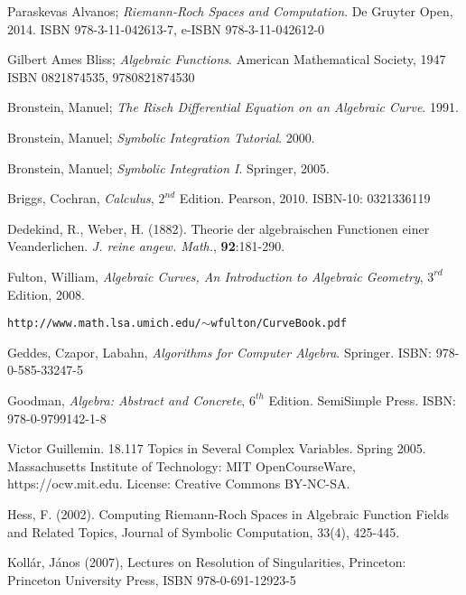 

\begin{thebibliography}{9}

Paraskevas Alvanos;
{\it Riemann-Roch Spaces and Computation}.
De Gruyter Open, 2014.
ISBN 978-3-11-042613-7, e-ISBN 978-3-11-042612-0

Gilbert Ames Bliss; {\it Algebraic Functions}. American Mathematical Society, 1947
ISBN 0821874535, 9780821874530

Bronstein, Manuel; {\it The Risch Differential Equation on an Algebraic Curve}. 1991.

Bronstein, Manuel; {\it Symbolic Integration Tutorial}. 2000.

Bronstein, Manuel; {\it Symbolic Integration I}. Springer, 2005.

Briggs, Cochran, {\it Calculus}, $2^{nd}$ Edition.  Pearson, 2010.  ISBN-10: 0321336119

Dedekind, R., Weber, H. (1882). Theorie der algebraischen Functionen einer Veanderlichen.
{\it J. reine angew. Math.}, {\bf 92}:181-290.

Fulton, William, {\it Algebraic Curves, An Introduction to Algebraic Geometry}, $3^{rd}$ Edition, 2008.

{\tt http://www.math.lsa.umich.edu/$\sim$wfulton/CurveBook.pdf}

Geddes, Czapor, Labahn, {\it Algorithms for Computer Algebra}. Springer.
ISBN: 978-0-585-33247-5

Goodman, {\it Algebra: Abstract and Concrete}, $6^{th}$ Edition.  SemiSimple Press.
ISBN: 978-0-9799142-1-8

Victor Guillemin. 18.117 Topics in Several Complex Variables. Spring 2005. Massachusetts Institute of Technology: MIT OpenCourseWare, https://ocw.mit.edu. License: Creative Commons BY-NC-SA.

Hess, F. (2002). Computing Riemann-Roch Spaces in Algebraic Function Fields and Related Topics,
Journal of Symbolic Computation, 33(4), 425-445.

Kollár, János (2007), Lectures on Resolution of Singularities, Princeton: Princeton University Press, ISBN 978-0-691-12923-5


\end{thebibliography}

